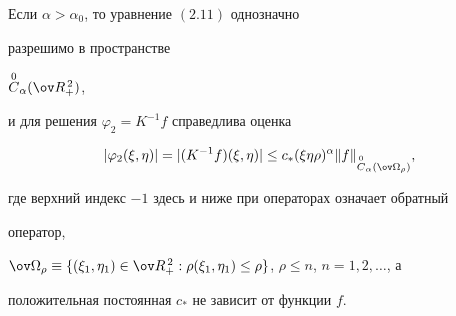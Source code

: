 \begin{lems}


Если $\alpha>\alpha_0$, то уравнение $(2.11)$ однозначно


разрешимо в пространстве


$\OC_\alpha(\ov R^{\,2}_+)$,


и для решения $\varphi_2=K^{-1}f$ справедлива оценка


\begin{equation}


|\varphi_2(\xi,\eta)|=|(K^{-1}f)(\xi,\eta)|\le


c_*(\xi\eta\rho)^\alpha\|f\|_{\OC_\alpha(\ov\Omega_\rho)},


\end{equation}


где верхний индекс $-1$ здесь и ниже при операторах означает обратный


оператор,


$\ov\Omega_\rho\equiv\{(\xi_1,\eta_1)\in\ov R^{\,2}_+:


\rho(\xi_1,\eta_1)\le\rho\}$, $\rho\le n$, $n=1,2,\dotsc$, а


положительная постоянная $c_*$ не зависит от функции $f$.


\end{lems}





